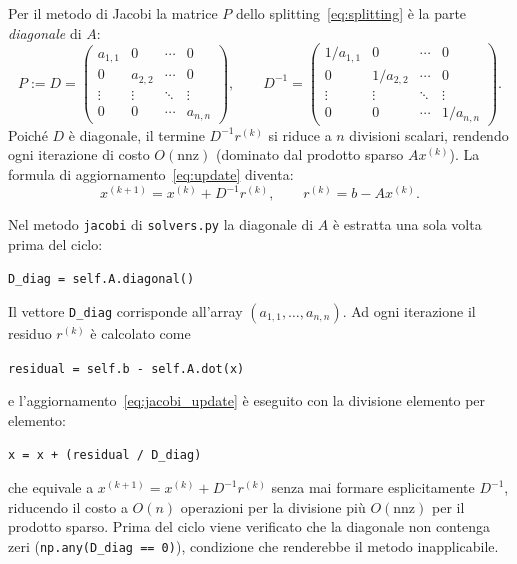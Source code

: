 \documentclass[a4paper,12pt]{article}
\begin{document}
Per il metodo di Jacobi la matrice $P$ dello splitting~\eqref{eq:splitting}
è la parte \emph{diagonale} di $A$:
\begin{equation}
    P := D =
    \begin{pmatrix}
        a_{1,1} & 0       & \cdots & 0       \\
        0       & a_{2,2} & \cdots & 0       \\
        \vdots  & \vdots  & \ddots & \vdots  \\
        0       & 0       & \cdots & a_{n,n}
    \end{pmatrix},
    \qquad
    D^{-1} =
    \begin{pmatrix}
        1/a_{1,1} & 0         & \cdots & 0         \\
        0         & 1/a_{2,2} & \cdots & 0         \\
        \vdots    & \vdots    & \ddots & \vdots    \\
        0         & 0         & \cdots & 1/a_{n,n}
    \end{pmatrix}.
\end{equation}
Poiché $D$ è diagonale, il termine $D^{-1}r^{(k)}$ si riduce a $n$ divisioni
scalari, rendendo ogni iterazione di costo $O(\text{nnz})$ (dominato dal
prodotto sparso $Ax^{(k)}$). La formula di aggiornamento~\eqref{eq:update} diventa:
\begin{equation}
    x^{(k+1)} = x^{(k)} + D^{-1} r^{(k)}, \qquad r^{(k)} = b - Ax^{(k)}.
    \label{eq:jacobi_update}
\end{equation}

\begin{implbox}
Nel metodo \texttt{jacobi} di \texttt{solvers.py} la diagonale di $A$ è
estratta una sola volta prima del ciclo:
\begin{center}
\texttt{D\_diag = self.A.diagonal()}
\end{center}
Il vettore \texttt{D\_diag} corrisponde all'array $(a_{1,1},\dots,a_{n,n})$.
Ad ogni iterazione il residuo $r^{(k)}$ è calcolato come
\begin{center}
\texttt{residual = self.b - self.A.dot(x)}
\end{center}
e l'aggiornamento~\eqref{eq:jacobi_update} è eseguito con la divisione
elemento per elemento:
\begin{center}
\texttt{x = x + (residual / D\_diag)}
\end{center}
che equivale a $x^{(k+1)} = x^{(k)} + D^{-1}r^{(k)}$ senza mai formare
esplicitamente $D^{-1}$, riducendo il costo a $O(n)$ operazioni per la
divisione più $O(\text{nnz})$ per il prodotto sparso. Prima del ciclo viene
verificato che la diagonale non contenga zeri (\texttt{np.any(D\_diag == 0)}),
condizione che renderebbe il metodo inapplicabile.
\end{implbox}
\end{document}
